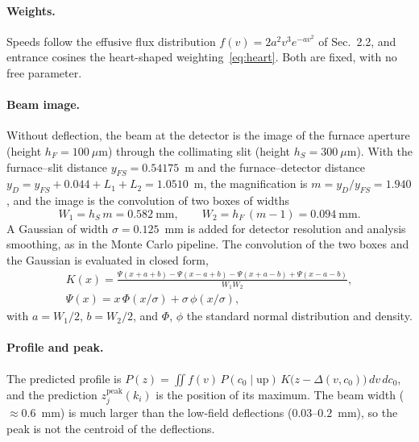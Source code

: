 \documentclass[11pt,a4paper]{article}
\newcommand{\kan}{k_i}
\begin{document}
\paragraph{Weights.} Speeds follow the effusive flux distribution $f(v) = 2a^2v^3e^{-av^2}$ of Sec.~2.2, and entrance cosines the heart-shaped weighting~\eqref{eq:heart}. Both are fixed, with no free parameter.

\paragraph{Beam image.} Without deflection, the beam at the detector is the image of the furnace aperture (height $h_F = 100~\mu$m) through the collimating slit (height $h_S = 300~\mu$m). With the furnace--slit distance $y_{FS} = 0.54175$~m and the furnace--detector distance $y_D = y_{FS} + 0.044 + L_1 + L_2 = 1.0510$~m, the magnification is $m = y_D/y_{FS} = 1.940$, and the image is the convolution of two boxes of widths
\begin{equation}
W_1 = h_S\,m = 0.582\ \text{mm},\qquad W_2 = h_F\,(m-1) = 0.094\ \text{mm}.
\end{equation}
A Gaussian of width $\sigma = 0.125$~mm is added for detector resolution and analysis smoothing, as in the Monte Carlo pipeline. The convolution of the two boxes and the Gaussian is evaluated in closed form,
\begin{equation}
\begin{gathered}
K(x) = \frac{\Psi(x+a+b)-\Psi(x-a+b)-\Psi(x+a-b)+\Psi(x-a-b)}{W_1W_2},\\
\Psi(x) = x\,\Phi(x/\sigma)+\sigma\,\phi(x/\sigma),
\end{gathered}
\end{equation}
with $a = W_1/2$, $b = W_2/2$, and $\Phi$, $\phi$ the standard normal distribution and density.

\paragraph{Profile and peak.} The predicted profile is $P(z) = \iint f(v)\,P(c_0\mid\text{up})\,K\big(z-\Delta(v,c_0)\big)\,dv\,dc_0$, and the prediction $z_j^\text{peak}(\kan)$ is the position of its maximum. The beam width ($\approx0.6$~mm) is much larger than the low-field deflections ($0.03$--$0.2$~mm), so the peak is not the centroid of the deflections.
\end{document}
